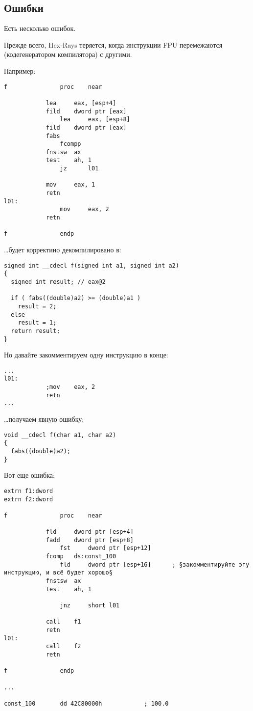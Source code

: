 \label{hex_rays}

\subsection{Ошибки}

Есть несколько ошибок.

Прежде всего, Hex-Rays теряется, когда инструкции \ac{FPU} перемежаются (кодегенератором компилятора) с другими.

Например:

\begin{lstlisting}
f               proc    near

        	lea     eax, [esp+4]
	        fild    dword ptr [eax]
                lea     eax, [esp+8]
        	fild    dword ptr [eax]
	        fabs
                fcompp
        	fnstsw  ax
	        test    ah, 1
                jz      l01

        	mov     eax, 1
	        retn
l01:
                mov     eax, 2
	        retn

f               endp
\end{lstlisting}

\dots будет корректино декомпилировано в:

\begin{lstlisting}
signed int __cdecl f(signed int a1, signed int a2)
{
  signed int result; // eax@2

  if ( fabs((double)a2) >= (double)a1 )
    result = 2;
  else
    result = 1;
  return result;
}
\end{lstlisting}

Но давайте закомментируем одну инструкцию в конце:

\begin{lstlisting}
...
l01:
	        ;mov    eax, 2
        	retn
...
\end{lstlisting}

\dots получаем явную ошибку:

\begin{lstlisting}
void __cdecl f(char a1, char a2)
{
  fabs((double)a2);
}
\end{lstlisting}

Вот еще ошибка:

\begin{lstlisting}
extrn f1:dword
extrn f2:dword

f               proc    near

	        fld     dword ptr [esp+4]
        	fadd    dword ptr [esp+8]
                fst     dword ptr [esp+12]
	        fcomp   ds:const_100
                fld     dword ptr [esp+16]      ; §закомментируйте эту инструкцию, и всё будет хорошо§
	        fnstsw  ax
        	test    ah, 1

                jnz     short l01

	        call    f1
        	retn
l01:
	        call    f2
        	retn

f               endp

...

const_100       dd 42C80000h            ; 100.0
\end{lstlisting}

